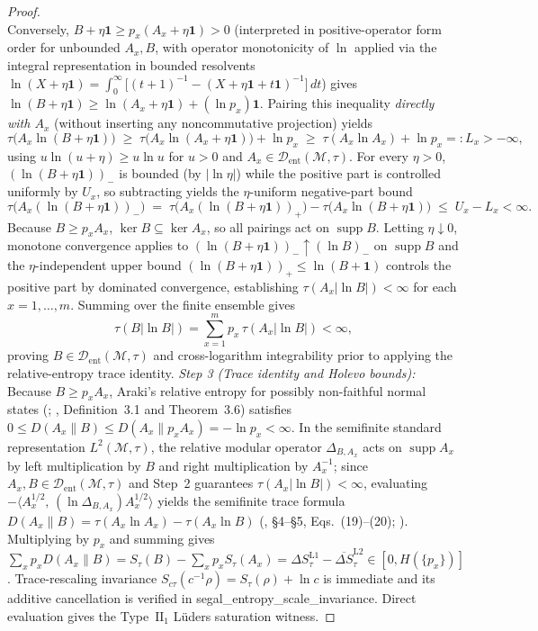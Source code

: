 \documentclass[11pt,a4paper]{article}
\theoremstyle{definition}
\theoremstyle{remark}
\newcommand{\supp}{\operatorname{supp}}
\newcommand{\cD}{\mathcal{D}}
\newcommand{\cM}{\mathcal{M}}
\newcommand{\1}{\mathbf{1}}
\newcommand{\code}[1]{{\scriptsize\ttfamily #1}}
\begin{document}
\begin{proof}
\begin{equation*}
\end{equation*}
Conversely, $B+\eta\1 \ge p_x(A_x+\eta\1) > 0$ (interpreted in positive-operator form order for unbounded $A_x,B$, with operator monotonicity of $\ln$ applied via the integral representation in bounded resolvents $\ln(X+\eta\1)=\int_0^\infty\bigl[(t+1)^{-1}-(X+\eta\1+t\1)^{-1}\bigr]\,dt$) gives $\ln(B+\eta\1)\ge\ln(A_x+\eta\1)+(\ln p_x)\1$. Pairing this inequality \emph{directly with $A_x$} (without inserting any noncommutative projection) yields
\begin{equation*}
  \tau\bigl(A_x\ln(B+\eta\1)\bigr)
  \;\ge\; \tau\bigl(A_x\ln(A_x+\eta\1)\bigr) + \ln p_x
  \;\ge\; \tau(A_x\ln A_x) + \ln p_x =: L_x > -\infty,
\end{equation*}
using $u\ln(u+\eta)\ge u\ln u$ for $u>0$ and $A_x\in\cD_{\mathrm{ent}}(\cM,\tau)$. For every $\eta>0$, $(\ln(B+\eta\1))_-$ is bounded (by $|\ln\eta|$) while the positive part is controlled uniformly by $U_x$, so subtracting yields the $\eta$-uniform negative-part bound
\begin{equation*}
  \tau\bigl(A_x(\ln(B+\eta\1))_-\bigr)
  \;=\; \tau\bigl(A_x(\ln(B+\eta\1))_+\bigr) - \tau\bigl(A_x\ln(B+\eta\1)\bigr)
  \;\le\; U_x - L_x < \infty.
\end{equation*}
Because $B\ge p_x A_x$, $\ker B\subseteq\ker A_x$, so all pairings act on $\supp B$. Letting $\eta\downarrow 0$, monotone convergence applies to $(\ln(B+\eta\1))_-\uparrow (\ln B)_-$ on $\supp B$ and the $\eta$-independent upper bound $(\ln(B+\eta\1))_+\le\ln(B+\1)$ controls the positive part by dominated convergence, establishing $\tau(A_x|\ln B|)<\infty$ for each $x=1,\dots,m$. Summing over the finite ensemble gives
\begin{equation*}
  \tau(B|\ln B|) = \sum_{x=1}^m p_x\,\tau(A_x|\ln B|) < \infty,
\end{equation*}
proving $B\in\cD_{\mathrm{ent}}(\cM,\tau)$ and cross-logarithm integrability prior to applying the relative-entropy trace identity.
\emph{Step 3 (Trace identity and Holevo bounds):} Because $B\ge p_x A_x$, Araki's relative entropy for possibly non-faithful normal states (\cite{Araki1976}; \cite{Araki1977}, Definition~3.1 and Theorem~3.6) satisfies $0\le D(A_x\|B)\le D(A_x\|p_x A_x)=-\ln p_x<\infty$. In the semifinite standard representation $L^2(\cM,\tau)$, the relative modular operator $\Delta_{B,A_x}$ acts on $\supp A_x$ by left multiplication by $B$ and right multiplication by $A_x^{-1}$; since $A_x,B\in\cD_{\mathrm{ent}}(\cM,\tau)$ and Step~2 guarantees $\tau(A_x|\ln B|)<\infty$, evaluating $-\langle A_x^{1/2},\,(\ln\Delta_{B,A_x})A_x^{1/2}\rangle$ yields the semifinite trace formula $D(A_x\|B)=\tau(A_x\ln A_x)-\tau(A_x\ln B)$ (\cite{LongoWitten2023}, \S4--\S5, Eqs.~(19)--(20); \cite{PodsedkowskaWieczorek2017}). Multiplying by $p_x$ and summing gives $\sum_x p_x D(A_x\|B)=S_\tau(B)-\sum_x p_x S_\tau(A_x)=\Delta S_\tau^{\mathrm{L1}}-\overline{\Delta S}_\tau^{\mathrm{L2}}\in[0,H(\{p_x\})]$. Trace-rescaling invariance $S_{c\tau}(c^{-1}\rho)=S_\tau(\rho)+\ln c$ is immediate and its additive cancellation is verified in \code{segal\_\allowbreak entropy\_\allowbreak scale\_\allowbreak invariance}. Direct evaluation gives the Type~$\mathrm{II}_1$ L\"uders saturation witness.

\end{proof}
\end{document}
